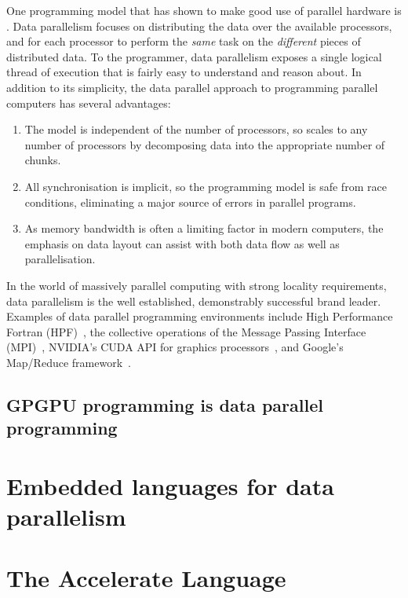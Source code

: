 One programming model that has shown to make good use of parallel hardware is
.
Data parallelism focuses on distributing the data over the available processors,
and for each processor to perform the \emph{same} task on the \emph{different}
pieces of distributed data. To the programmer, data parallelism exposes a single
logical thread of execution that is fairly easy to understand and reason about.
In addition to its simplicity, the data parallel approach to programming
parallel computers has several advantages:
%
\begin{enumerate}
\item The model is independent of the number of processors, so scales to any
    number of processors by decomposing data into the appropriate number of
    chunks.

\item All synchronisation is implicit, so the programming model is safe from
    race conditions, eliminating a major source of errors in parallel programs.

\item As memory bandwidth is often a limiting factor in modern computers, the
    emphasis on data layout can assist with both data flow as well as
    parallelisation.
\end{enumerate}
%
In the world of massively parallel computing with strong locality requirements,
data parallelism is the well established, demonstrably successful brand leader.
Examples of data parallel programming environments include High Performance
Fortran (HPF)~\cite{HPF:1997}, the collective operations of the Message Passing
Interface (MPI)~\cite{MPI:2012}, NVIDIA's CUDA API for graphics
processors~\cite{NVIDIA:2012wf}, and Google's Map/Reduce
framework~\cite{Dean:2008fi}.


\subsection{GPGPU programming is data parallel programming}

\section{Embedded languages for data parallelism}

\section{The Accelerate Language}




